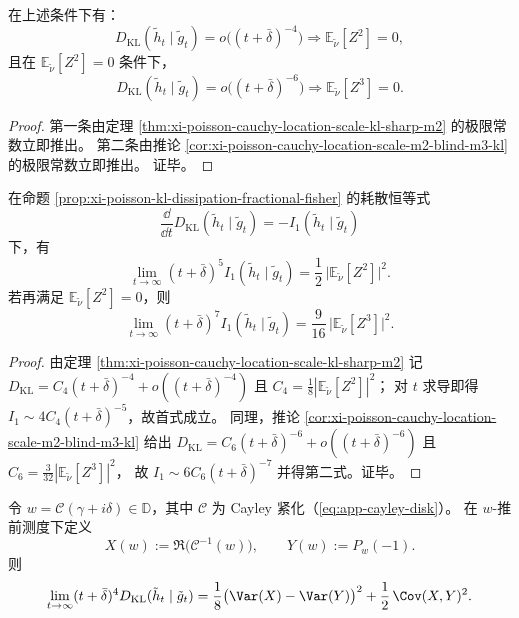 \begin{corollary}[超四次与超六次衰减的层级刚性]\label{cor:xi-poisson-cauchy-location-scale-hierarchy-rigidity}
在上述条件下有：
\[
D_{\mathrm{KL}}(\tilde h_t\mid \tilde g_t)=o\!\bigl((t+\bar\delta)^{-4}\bigr)
\Longrightarrow \mathbb E_{\tilde\nu}[Z^2]=0,
\]
且在 \(\mathbb E_{\tilde\nu}[Z^2]=0\) 条件下，
\[
D_{\mathrm{KL}}(\tilde h_t\mid \tilde g_t)=o\!\bigl((t+\bar\delta)^{-6}\bigr)
\Longrightarrow \mathbb E_{\tilde\nu}[Z^3]=0.
\]
\end{corollary}

\begin{proof}
第一条由定理 \ref{thm:xi-poisson-cauchy-location-scale-kl-sharp-m2} 的极限常数立即推出。
第二条由推论 \ref{cor:xi-poisson-cauchy-location-scale-m2-blind-m3-kl} 的极限常数立即推出。
证毕。
\end{proof}

\begin{corollary}[耗散量的两级锐渐近常数]\label{cor:xi-poisson-cauchy-location-scale-i1-two-level}
在命题 \ref{prop:xi-poisson-kl-dissipation-fractional-fisher} 的耗散恒等式
\[
\frac{\dd}{\dd t}D_{\mathrm{KL}}(\tilde h_t\mid \tilde g_t)=-I_1(\tilde h_t\mid \tilde g_t)
\]
下，有
\[
\lim_{t\to\infty}(t+\bar\delta)^5 I_1(\tilde h_t\mid \tilde g_t)
=\frac12\,\bigl|\mathbb E_{\tilde\nu}[Z^2]\bigr|^2.
\]
若再满足 \(\mathbb E_{\tilde\nu}[Z^2]=0\)，则
\[
\lim_{t\to\infty}(t+\bar\delta)^7 I_1(\tilde h_t\mid \tilde g_t)
=\frac{9}{16}\,\bigl|\mathbb E_{\tilde\nu}[Z^3]\bigr|^2.
\]
\end{corollary}

\begin{proof}
由定理 \ref{thm:xi-poisson-cauchy-location-scale-kl-sharp-m2} 记
\(
D_{\mathrm{KL}}=C_4 (t+\bar\delta)^{-4}+o((t+\bar\delta)^{-4})
\)
且
\(
C_4=\frac18|\mathbb E_{\tilde\nu}[Z^2]|^2
\)；
对 \(t\) 求导即得
\(
I_1\sim 4C_4 (t+\bar\delta)^{-5}
\)，故首式成立。
同理，推论 \ref{cor:xi-poisson-cauchy-location-scale-m2-blind-m3-kl} 给出
\(
D_{\mathrm{KL}}=C_6 (t+\bar\delta)^{-6}+o((t+\bar\delta)^{-6})
\)
且
\(
C_6=\frac{3}{32}|\mathbb E_{\tilde\nu}[Z^3]|^2
\)，
故
\(
I_1\sim 6C_6 (t+\bar\delta)^{-7}
\)
并得第二式。证毕。
\end{proof}

\begin{corollary}\label{cor:xi-poisson-cauchy-location-scale-busemann-rewrite}
令 \(w=\mathcal C(\gamma+i\delta)\in\mathbb D\)，其中 \(\mathcal C\) 为 Cayley 紧化（\eqref{eq:app-cayley-disk}）。
在 \(w\)-推前测度下定义
\[
X(w):=\Re\!\bigl(\mathcal C^{-1}(w)\bigr),\qquad
Y(w):=P_w(-1).
\]
则
\[
\lim_{t\to\infty}(t+\bar\delta)^4 D_{\mathrm{KL}}(\tilde h_t\mid \tilde g_t)
=\frac18\bigl(\Var(X)-\Var(Y)\bigr)^2+\frac12\,\Cov(X,Y)^2.
\]
\end{corollary}

